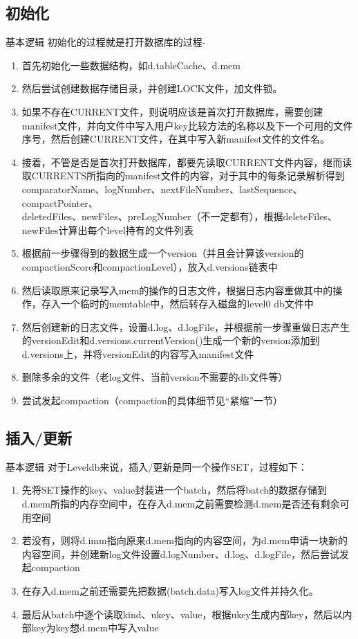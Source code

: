\documentclass[CJK, 8pt]{beamer}
\begin{document}
\begin{CJK*}{UTF8}{gkai}
\subsection{初始化}
\begin{frame}{基本逻辑}
初始化的过程就是打开数据库的过程-
\begin{enumerate}
\item 首先初始化一些数据结构，如d.tableCache、d.mem
\item 然后尝试创建数据存储目录，并创建LOCK文件，加文件锁。
\item 如果不存在CURRENT文件，则说明应该是首次打开数据库，需要创建manifest文件，并向文件中写入用户key比较方法的名称以及下一个可用的文件序号，然后创建CURRENT文件，在其中写入新manifest文件的文件名。
\item 接着，不管是否是首次打开数据库，都要先读取CURRENT文件内容，继而读取CURRENTS所指向的manifest文件的内容，对于其中的每条记录解析得到comparatorName、logNumber、nextFileNumber、lastSequence、compactPointer、\\deletedFiles、newFiles、preLogNumber（不一定都有），根据deleteFiles、newFiles计算出每个level持有的文件列表
\item 根据前一步骤得到的数据生成一个version（并且会计算该version的compactionScore和compactionLevel），放入d.versions链表中
\item 然后读取原来记录写入mem的操作的日志文件，根据日志内容重做其中的操作，存入一个临时的memtable中，然后转存入磁盘的level0 db文件中
\item 然后创建新的日志文件，设置d.log、d.logFile，并根据前一步骤重做日志产生的versionEdit和d.versions.currentVersion()生成一个新的version添加到d.versions上，并将versionEdit的内容写入manifest文件
\item 删除多余的文件（老log文件、当前version不需要的db文件等）
\item 尝试发起compaction（compaction的具体细节见“紧缩”一节）
\end{enumerate}
\end{frame}
\subsection{插入/更新}
\begin{frame}{基本逻辑}
对于Leveldb来说，插入/更新是同一个操作SET，过程如下：
\begin{enumerate}
\item 先将SET操作的key、value封装进一个batch，然后将batch的数据存储到d.mem所指的内存空间中，在存入d.mem之前需要检测d.mem是否还有剩余可用空间
\item 若没有，则将d.imm指向原来d.mem指向的内容空间，为d.mem申请一块新的内容空间，并创建新log文件设置d.logNumber、d.log、d.logFile，然后尝试发起compaction
\item 在存入d.mem之前还需要先把数据(batch.data)写入log文件并持久化。
\item 最后从batch中逐个读取kind、ukey、value，根据ukey生成内部key，然后以内部key为key想d.mem中写入value
\end{enumerate}
\end{frame}


\end{CJK*}
\end{document}
